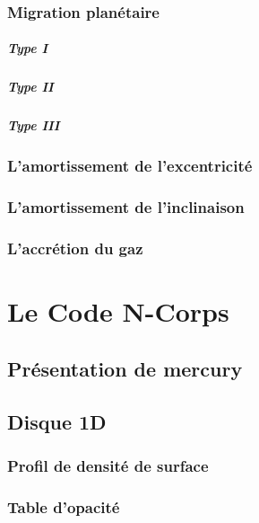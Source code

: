\documentclass[a4paper,twoside]{book}
\begin{document}
\subsection{Migration planétaire}
\paragraph{Type I}
\paragraph{Type II}
\paragraph{Type III}

\subsection{L'amortissement de l'excentricité}%

\subsection{L'amortissement de l'inclinaison}%

\subsection{L'accrétion du gaz}

\chapter{Le Code N-Corps}
\section{Présentation de mercury}
\section{Disque 1D}
\subsection{Profil de densité de surface}
\subsection{Table d'opacité}
\end{document}
